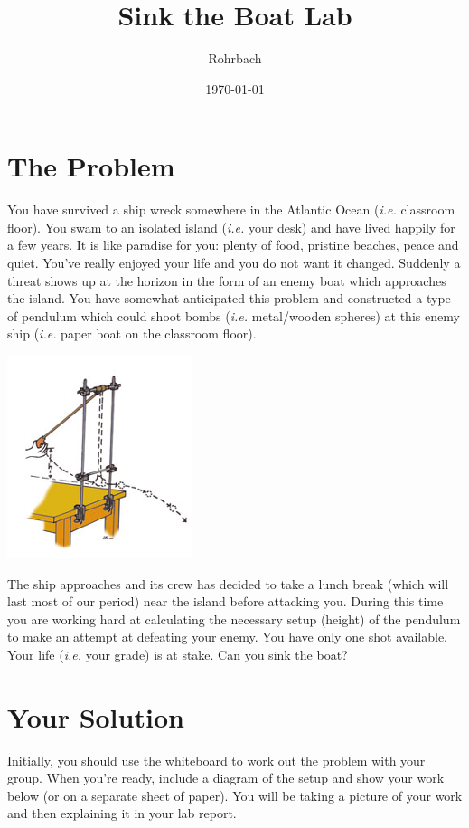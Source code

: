 \documentclass[10pt]{exam}
\title{Sink the Boat Lab}
\author{Rohrbach}
\date{\today}
\begin{document}
\maketitle


\section*{The Problem}

You have survived a ship wreck somewhere in the Atlantic Ocean (\emph{i.e.} classroom floor). You swam to an isolated island (\emph{i.e.} your desk) and have lived happily for a few years. It is like paradise for you: plenty of food, pristine beaches, peace and quiet. You've really enjoyed your life and you do not want it changed. Suddenly a threat shows up at the horizon in the form of an enemy boat which approaches the island. You have somewhat anticipated this problem and constructed a type of pendulum which could shoot bombs (\emph{i.e.} metal/wooden spheres) at this enemy ship (\emph{i.e.} paper boat on the classroom floor). 

\includegraphics{release-your-potential.png}


The ship approaches and its crew has decided to take a lunch break (which will last most of our period) near the island before attacking you. During this time you are working hard at calculating the necessary setup (height) of the pendulum to make an attempt at defeating your enemy. You have only one shot available. Your life (\emph{i.e.} your grade) is at stake. Can you sink the boat?


\section*{Your Solution}

Initially, you should use the whiteboard to work out the problem with your group.  When you're ready, include a diagram of the setup and show your work below (or on a separate sheet of paper).  You will be taking a picture of your work and then explaining it in your lab report.
\end{document}
